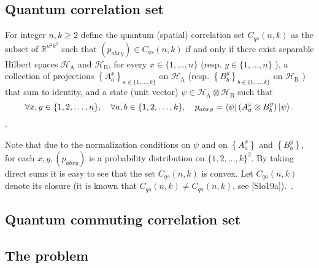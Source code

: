 \subsection{Quantum correlation set}

\begin{defn}
    For integer $n, k \geq 2$ define the quantum (spatial) correlation set $C_{q s}(n, k)$ as the subset of $\mathbb{R}^{n^{2} k^{2}}$ such that $\left(p_{a b x y}\right) \in C_{q s}(n, k)$ if and only if there exist separable Hilbert spaces $\mathcal{H}_{\mathrm{A}}$ and $\mathcal{H}_{\mathrm{B}}$, for every $x \in\{1, \ldots, n\}$ (resp. $y \in\{1, \ldots, n\}$ ), a collection of projections $\left\{A_{a}^{x}\right\}_{a \in\{1, \ldots, k\}}$ on $\mathcal{H}_{\mathrm{A}}$ (resp. $\left\{B_{b}^{y}\right\}_{b \in\{1, \ldots, k\}}$ on $\mathcal{H}_{\mathrm{B}}$ ) that sum to identity, and a state (unit vector) $\psi \in \mathcal{H}_{\mathrm{A}} \otimes \mathcal{H}_{\mathrm{B}}$ such that
    \begin{equation}
    \forall x, y \in\{1,2, \ldots, n\}, \quad \forall a, b \in\{1,2, \ldots, k\}, \quad p_{a b x y}=\bra{\psi}\left(A_{a}^{x} \otimes B_{b}^{y}\right) \ket{\psi} .
    \end{equation}.
\end{defn}

Note that due to the normalization conditions on $\psi$ and on $\left\{A_{a}^{x}\right\}$ and $\left\{B_{b}^{y}\right\}$, for each $x, y,\left(p_{a b x y}\right)$ is a probability distribution on $\{1,2, \ldots, k\}^{2}$. By taking direct sums it is easy to see that the set $C_{q s}(n, k)$ is convex. Let $C_{q a}(n, k)$ denote its closure (it is known that $C_{q s}(n, k) \neq C_{q a}(n, k)$, see [Slo19a]).~\cite{mipre}.

\subsection{Quantum commuting correlation set}


\subsection{The problem}
